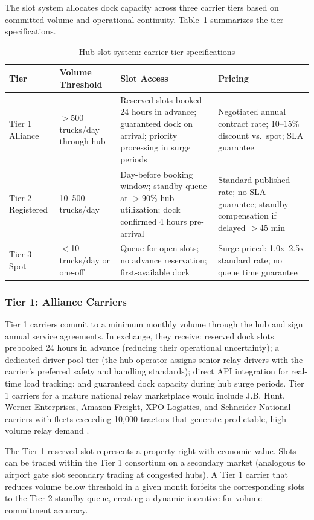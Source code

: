 The slot system allocates dock capacity across three carrier tiers based on committed volume and operational continuity. Table~\ref{tab:tiers} summarizes the tier specifications.

\begin{table}[ht]
\centering
\caption{Hub slot system: carrier tier specifications}
\label{tab:tiers}
\begin{tabular}{p{2.5cm}p{3cm}p{3.5cm}p{4cm}}
\toprule
\textbf{Tier} & \textbf{Volume Threshold} & \textbf{Slot Access} & \textbf{Pricing} \\
\midrule
Tier 1 Alliance & $>$500 trucks/day through hub & Reserved slots booked 24 hours in advance; guaranteed dock on arrival; priority processing in surge periods & Negotiated annual contract rate; 10--15\% discount vs.\ spot; SLA guarantee \\
Tier 2 Registered & 10--500 trucks/day & Day-before booking window; standby queue at $>$90\% hub utilization; dock confirmed 4 hours pre-arrival & Standard published rate; no SLA guarantee; standby compensation if delayed $>$45 min \\
Tier 3 Spot & $<$10 trucks/day or one-off & Queue for open slots; no advance reservation; first-available dock & Surge-priced: 1.0x--2.5x standard rate; no queue time guarantee \\
\bottomrule
\end{tabular}
\end{table}

\subsubsection*{Tier 1: Alliance Carriers}

Tier 1 carriers commit to a minimum monthly volume through the hub and sign annual service agreements. In exchange, they receive: reserved dock slots prebooked 24 hours in advance (reducing their operational uncertainty); a dedicated driver pool tier (the hub operator assigns senior relay drivers with the carrier's preferred safety and handling standards); direct API integration for real-time load tracking; and guaranteed dock capacity during hub surge periods. Tier 1 carriers for a mature national relay marketplace would include J.B. Hunt, Werner Enterprises, Amazon Freight, XPO Logistics, and Schneider National --- carriers with fleets exceeding 10,000 tractors that generate predictable, high-volume relay demand \citep{FHWA_freight2023}.

The Tier 1 reserved slot represents a property right with economic value. Slots can be traded within the Tier 1 consortium on a secondary market (analogous to airport gate slot secondary trading at congested hubs). A Tier 1 carrier that reduces volume below threshold in a given month forfeits the corresponding slots to the Tier 2 standby queue, creating a dynamic incentive for volume commitment accuracy.

